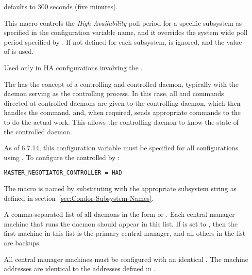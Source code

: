 \begin{description}
   defaults to 300 seconds (five minutes).

\item[\Macro{HA\_<SUBSYS>\_POLL\_PERIOD}]
  \label{param:HALockPollSubsysPeriod}
  This macro controls the \emph{High Availability} poll period
  for a specific subsystem
  as specified in the configuration variable name,
  and it overrides the system wide poll period specified by
  .
  If not defined for each subsystem,
   is ignored,
  and the value of  is used.

\item[\Macro{MASTER\_<SUBSYS>\_CONTROLLER}]
  \label{param:MasterSubsysController} Used only in HA configurations
  involving the .

  The  has the concept of a controlling and controlled
  daemon, typically
  with the  daemon serving as the controlling process.
  In this case, all  and  commands directed
  at controlled daemons are given to the controlling daemon, which
  then handles the command, and, when required, sends appropriate
  commands to the  to do the actual work.  This allows
  the controlling daemon to know the state of the controlled daemon.

  As of 6.7.14, this configuration variable must be specified for all
  configurations using .
  To configure the  controlled by :

\begin{verbatim}
MASTER_NEGOTIATOR_CONTROLLER = HAD
\end{verbatim}

  The macro is named by substituting 
  with the appropriate subsystem string as defined in
  section~\ref{sec:Condor-Subsystem-Names}.


\item[\Macro{HAD\_LIST}]
  \label{param:HADList}
  A comma-separated list of all  daemons
  in the form  or .
  Each central manager machine that runs the  daemon
  should appear in this list.
  If  is set to ,
  then the first machine in this list is the primary central
  manager, and all others in the list are backups.

  All central manager machines must be configured with 
  an identical .
  The machine addresses are identical to the addresses defined
  in .


\end{description}
